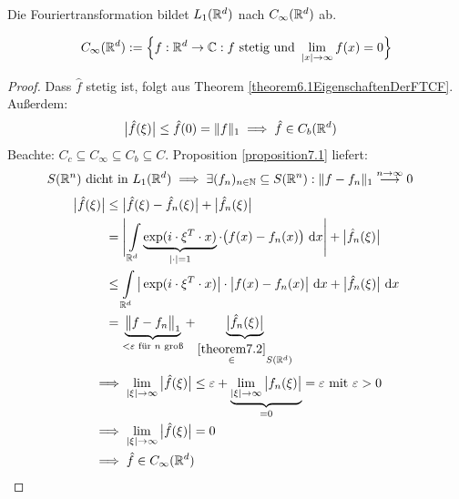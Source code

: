 \begin{korollar}\label{korollar7.3RiemanndLebesgue-Lemma}\enter
Die Fouriertransformation bildet $L_1(\mathbb{R}^d)$ nach $C_\infty(\mathbb{R}^d)$ ab.
\end{korollar}

\begin{bemerkung}
\begin{align*}
C_\infty(\mathbb{R}^d):=\Big\lbrace f:\mathbb{R}^d\to\mathbb{C}: f\text{ stetig und }\lim\limits_{|x|\to\infty}f(x)=0\Big\rbrace
\end{align*}
\end{bemerkung}

\begin{proof}
Dass $\hat{f}$ stetig ist, folgt aus Theorem \ref{theorem6.1EigenschaftenDerFTCF}. Außerdem:
\begin{align*}
\big|\hat{f}(\xi)\big|
&\leq\hat{f}(0)=\Vert f\Vert_1\implies\hat{f}\in C_b(\mathbb{R}^d)
\end{align*}
Beachte: $C_c\subseteq C_\infty\subseteq C_b\subseteq C$.
Proposition \ref{proposition7.1} liefert:
\begin{align*}
S(\mathbb{R}^n)&\text{ dicht in }L_1(\mathbb{R}^d)\implies\exists(f_n)_{n\in\mathbb{N}}\subseteq S(\mathbb{R}^n):\Vert f-f_n\Vert_1\stackrel{n\to\infty}{\longrightarrow}0
\end{align*}
\begin{align*}
\big|\hat{f}(\xi)\big|
&\leq\big|\hat{f}(\xi)-\hat{f}_n(\xi)\big|+\big|\hat{f}_n(\xi)\big|\\
&=\Bigg|\int\limits_{\mathbb{R}^d}\underbrace{\exp(i\cdot\xi^T\cdot x)}_{|\cdot|=1}\cdot\big(f(x)-f_n(x)\big)\text{ d} x\Bigg|+\big|\hat{f}_n(\xi)\big|\\
&\leq
\int\limits_{\mathbb{R}^d}\big|\exp(i\cdot\xi^T\cdot x)\big|\cdot\big|f(x)-f_n(x)\big|\text{ d} x+\big|\hat{f}_n(\xi)\big|\text{ d} x\\
&=\underbrace{\big\Vert f-f_n\big\Vert_1}_{<\varepsilon\text{ für $n$ groß}}+\underbrace{\big|\hat{f}_n(\xi)\big|}_{\stackrel{\ref{theorem7.2}}{\in} S(\mathbb{R}^d)}
\end{align*}
\begin{align*}
&\implies
\lim\limits_{|\xi|\to\infty}\big|\hat{f}(\xi)\big|\leq\varepsilon+\underbrace{\lim\limits_{|\xi|\to\infty}\big|f_n(\xi)\big|}_{=0}=\varepsilon\text{ mit }\varepsilon>0\\
&\implies\lim\limits_{|\xi|\to\infty}\big|\hat{f}(\xi)\big|=0\\
&\implies\hat{f}\in C_\infty(\mathbb{R}^d)
\end{align*}
\end{proof}

